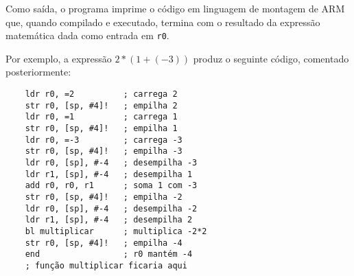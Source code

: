 \documentclass[brazilian,a4paper,twocolumn]{article}
\begin{document}
    Como saída, o programa imprime o código em linguagem de montagem de ARM que, quando compilado e executado, termina com o resultado da expressão matemática dada como entrada em \texttt{r0}.

    Por exemplo, a expressão $ 2 * (1 + (-3)) $ produz o seguinte código, comentado posteriormente:

\begin{verbatim}
    ldr r0, =2          ; carrega 2
    str r0, [sp, #4]!   ; empilha 2
    ldr r0, =1          ; carrega 1
    str r0, [sp, #4]!   ; empilha 1
    ldr r0, =-3         ; carrega -3
    str r0, [sp, #4]!   ; empilha -3
    ldr r0, [sp], #-4   ; desempilha -3
    ldr r1, [sp], #-4   ; desempilha 1
    add r0, r0, r1      ; soma 1 com -3
    str r0, [sp, #4]!   ; empilha -2
    ldr r0, [sp], #-4   ; desempilha -2
    ldr r1, [sp], #-4   ; desempilha 2
    bl multiplicar      ; multiplica -2*2
    str r0, [sp, #4]!   ; empilha -4
    end                 ; r0 mantém -4
    ; função multiplicar ficaria aqui
\end{verbatim}
\end{document}
